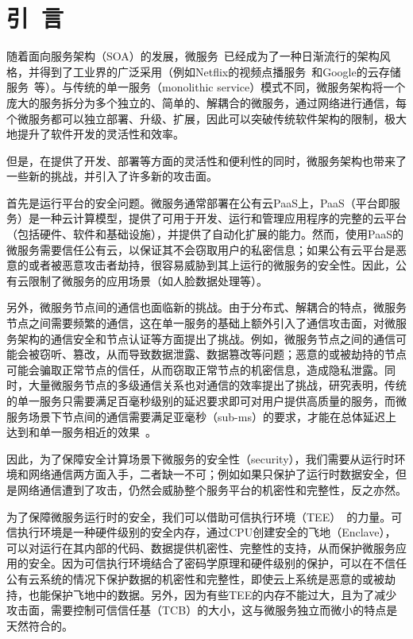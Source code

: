 \section{引\ 言}\label{sec:introduction}

随着面向服务架构（SOA）的发展，微服务~\cite{lewis2014microservices}已经成为了一种日渐流行的架构风格，并得到了工业界的广泛采用（例如Netflix的视频点播服务~\cite{msnetflix}和Google的云存储服务~\cite{msgoogle}等）。与传统的单一服务（monolithic service）模式不同，微服务架构将一个庞大的服务拆分为多个独立的、简单的、解耦合的微服务，通过网络进行通信，每个微服务都可以独立部署、升级、扩展，因此可以突破传统软件架构的限制，极大地提升了软件开发的灵活性和效率。


但是，在提供了开发、部署等方面的灵活性和便利性的同时，微服务架构也带来了一些新的挑战，并引入了许多新的攻击面。

首先是运行平台的安全问题。微服务通常部署在公有云PaaS上，PaaS（平台即服务）\cite{mell2011nist}是一种云计算模型，提供了可用于开发、运行和管理应用程序的完整的云平台（包括硬件、软件和基础设施），并提供了自动化扩展的能力。然而，使用PaaS的微服务需要信任公有云，以保证其不会窃取用户的私密信息；如果公有云平台是恶意的或者被恶意攻击者劫持，很容易威胁到其上运行的微服务的安全性。因此，公有云限制了微服务的应用场景（如人脸数据处理等）。

另外，微服务节点间的通信也面临新的挑战。由于分布式、解耦合的特点，微服务节点之间需要频繁的通信，这在单一服务的基础上额外引入了通信攻击面，对微服务架构的通信安全和节点认证等方面提出了挑战。例如，微服务节点之间的通信可能会被窃听、篡改，从而导致数据泄露、数据篡改等问题；恶意的或被劫持的节点可能会骗取正常节点的信任，从而窃取正常节点的机密信息，造成隐私泄露。同时，大量微服务节点的多级通信关系也对通信的效率提出了挑战，研究表明，传统的单一服务只需要满足百毫秒级别的延迟要求即可对用户提供高质量的服务，而微服务场景下节点间的通信需要满足亚毫秒（sub-ms）的要求，才能在总体延迟上达到和单一服务相近的效果~\cite{sriraman2018mutune}。

因此，为了保障安全计算场景下微服务的安全性（security），我们需要从运行时环境和网络通信两方面入手，二者缺一不可；例如如果只保护了运行时数据安全，但是网络通信遭到了攻击，仍然会威胁整个服务平台的机密性和完整性，反之亦然。

为了保障微服务运行时的安全，我们可以借助可信执行环境（TEE）~\cite{sabt2015trusted}的力量。可信执行环境是一种硬件级别的安全内存，通过CPU创建安全的飞地（Enclave），可以对运行在其内部的代码、数据提供机密性、完整性的支持，从而保护微服务应用的安全。因为可信执行环境结合了密码学原理和硬件级别的保护，可以在不信任公有云系统的情况下保护数据的机密性和完整性，即使云上系统是恶意的或被劫持，也能保护飞地中的数据。另外，因为有些TEE的内存不能过大，且为了减少攻击面，需要控制可信信任基（TCB）的大小，这与微服务独立而微小的特点是天然符合的。

